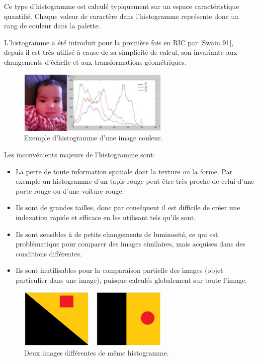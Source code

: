 Ce type d'histogramme est calculé typiquement sur un espace caractéristique quantifié. Chaque valeur de caractère dans l'histogramme représente donc un rang de couleur dans la
palette. 

L'histogramme a été introduit pour la première fois en  RIC par [Swain 91], depuis il est très utilisé à cause de sa simplicité de calcul, son invariante aux changements d'échelle et aux transformations géométriques.\\

\begin{figure}[H]
	\label{fig:hist}
	\centering
	\includegraphics[width=0.65\textwidth]{Figures/hist} %
	\caption{Exemple d’histogramme d’une image couleur.}
\end{figure}

Les inconvénients majeurs de l'histogramme sont:
\begin{itemize}
	\item La perte de toute information spatiale dont la texture ou la forme. Par exemple un histogramme d'un tapis rouge peut être très proche de celui d'une porte rouge ou d'une voiture rouge.
	
	\item Ils sont de grandes tailles, donc par conséquent il est difficile de créer une indexation rapide et efficace en les utilisant tels qu'ils sont. 
	
	\item Ils sont sensibles à de petits changements de luminosité, ce qui est problématique pour comparer des images similaires, mais acquises dans des conditions différentes. 
	
	\item Ils sont inutilisables pour la comparaison partielle des images (objet particulier dans une image), puisque calculés globalement sur toute l’image.
	
\end{itemize}

\begin{figure}[H]
	\label{fig:samehist}
	\centering
	\includegraphics[width=0.65\textwidth]{Figures/sameHist} %
	\caption{Deux images différentes de même histogramme.}
	
\end{figure}

